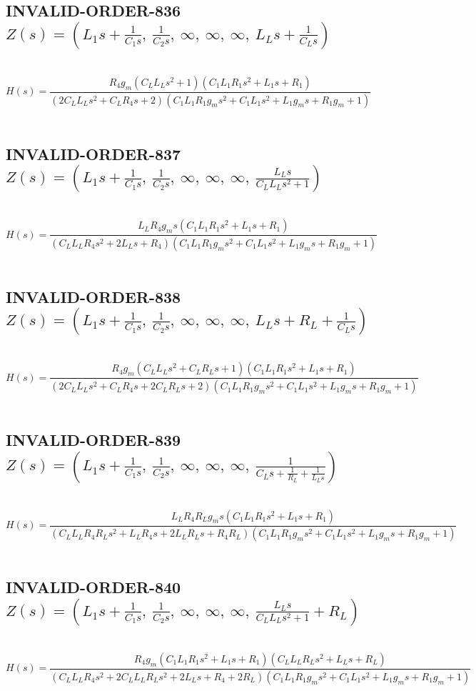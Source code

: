 \documentclass{article}
\begin{document}
\subsection{INVALID-ORDER-836 $Z(s) = \left( L_{1} s + \frac{1}{C_{1} s}, \  \frac{1}{C_{2} s}, \  \infty, \  \infty, \  \infty, \  L_{L} s + \frac{1}{C_{L} s}\right)$ } \ 
\textbf{\[H(s) = \frac{R_{4} g_{m} \left(C_{L} L_{L} s^{2} + 1\right) \left(C_{1} L_{1} R_{1} s^{2} + L_{1} s + R_{1}\right)}{\left(2 C_{L} L_{L} s^{2} + C_{L} R_{4} s + 2\right) \left(C_{1} L_{1} R_{1} g_{m} s^{2} + C_{1} L_{1} s^{2} + L_{1} g_{m} s + R_{1} g_{m} + 1\right)}\] } \ 
\subsection{INVALID-ORDER-837 $Z(s) = \left( L_{1} s + \frac{1}{C_{1} s}, \  \frac{1}{C_{2} s}, \  \infty, \  \infty, \  \infty, \  \frac{L_{L} s}{C_{L} L_{L} s^{2} + 1}\right)$ } \ 
\textbf{\[H(s) = \frac{L_{L} R_{4} g_{m} s \left(C_{1} L_{1} R_{1} s^{2} + L_{1} s + R_{1}\right)}{\left(C_{L} L_{L} R_{4} s^{2} + 2 L_{L} s + R_{4}\right) \left(C_{1} L_{1} R_{1} g_{m} s^{2} + C_{1} L_{1} s^{2} + L_{1} g_{m} s + R_{1} g_{m} + 1\right)}\] } \ 
\subsection{INVALID-ORDER-838 $Z(s) = \left( L_{1} s + \frac{1}{C_{1} s}, \  \frac{1}{C_{2} s}, \  \infty, \  \infty, \  \infty, \  L_{L} s + R_{L} + \frac{1}{C_{L} s}\right)$ } \ 
\textbf{\[H(s) = \frac{R_{4} g_{m} \left(C_{L} L_{L} s^{2} + C_{L} R_{L} s + 1\right) \left(C_{1} L_{1} R_{1} s^{2} + L_{1} s + R_{1}\right)}{\left(2 C_{L} L_{L} s^{2} + C_{L} R_{4} s + 2 C_{L} R_{L} s + 2\right) \left(C_{1} L_{1} R_{1} g_{m} s^{2} + C_{1} L_{1} s^{2} + L_{1} g_{m} s + R_{1} g_{m} + 1\right)}\] } \ 
\subsection{INVALID-ORDER-839 $Z(s) = \left( L_{1} s + \frac{1}{C_{1} s}, \  \frac{1}{C_{2} s}, \  \infty, \  \infty, \  \infty, \  \frac{1}{C_{L} s + \frac{1}{R_{L}} + \frac{1}{L_{L} s}}\right)$ } \ 
\textbf{\[H(s) = \frac{L_{L} R_{4} R_{L} g_{m} s \left(C_{1} L_{1} R_{1} s^{2} + L_{1} s + R_{1}\right)}{\left(C_{L} L_{L} R_{4} R_{L} s^{2} + L_{L} R_{4} s + 2 L_{L} R_{L} s + R_{4} R_{L}\right) \left(C_{1} L_{1} R_{1} g_{m} s^{2} + C_{1} L_{1} s^{2} + L_{1} g_{m} s + R_{1} g_{m} + 1\right)}\] } \ 
\subsection{INVALID-ORDER-840 $Z(s) = \left( L_{1} s + \frac{1}{C_{1} s}, \  \frac{1}{C_{2} s}, \  \infty, \  \infty, \  \infty, \  \frac{L_{L} s}{C_{L} L_{L} s^{2} + 1} + R_{L}\right)$ } \ 
\textbf{\[H(s) = \frac{R_{4} g_{m} \left(C_{1} L_{1} R_{1} s^{2} + L_{1} s + R_{1}\right) \left(C_{L} L_{L} R_{L} s^{2} + L_{L} s + R_{L}\right)}{\left(C_{L} L_{L} R_{4} s^{2} + 2 C_{L} L_{L} R_{L} s^{2} + 2 L_{L} s + R_{4} + 2 R_{L}\right) \left(C_{1} L_{1} R_{1} g_{m} s^{2} + C_{1} L_{1} s^{2} + L_{1} g_{m} s + R_{1} g_{m} + 1\right)}\] } \ 
\end{document}
